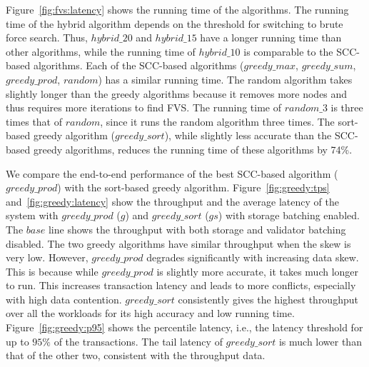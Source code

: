 Figure~\ref{fig:fvs:latency} shows the running time of the algorithms. The running time of the hybrid algorithm depends on the threshold for switching to brute force search. Thus, $hybrid\_20$ and $hybrid\_15$ have a longer running time than other algorithms, while the running time of $hybrid\_10$ is comparable to the SCC-based algorithms. Each of the SCC-based algorithms ($greedy\_max$, $greedy\_sum$, $greedy\_prod$, $random$) has a similar running time. The random algorithm takes slightly longer than the greedy algorithms because it removes more nodes and thus requires more iterations to find FVS. The running time of $random\_3$ is three times that of $random$, since it runs the random algorithm three times. The sort-based greedy algorithm ($greedy\_sort$), while slightly less accurate than the SCC-based greedy algorithms, reduces the running time of these algorithms by 74\%. 

We compare the end-to-end performance of the best SCC-based algorithm ($greedy\_prod$) with the sort-based greedy algorithm. Figure~\ref{fig:greedy:tps} and~\ref{fig:greedy:latency} show the throughput and the average latency of the system with $greedy\_prod$ ($g$) and $greedy\_sort$ ($gs$) with storage batching enabled. The $base$ line shows the throughput with both storage and validator batching disabled. 
The two greedy algorithms have similar throughput when the skew is very low. However, $greedy\_prod$ degrades significantly with increasing data skew. This is because while $greedy\_prod$ is slightly more accurate, it takes much longer to run. This increases transaction latency and leads to more conflicts, especially with high data contention. $greedy\_sort$ consistently gives the highest throughput over all the workloads for its high accuracy and low running time. 
Figure~\ref{fig:greedy:p95} shows the percentile latency, i.e., the latency threshold for up to $95\%$ of the transactions. The tail latency of $greedy\_sort$ is much lower than that of the other two, consistent with the throughput data.

